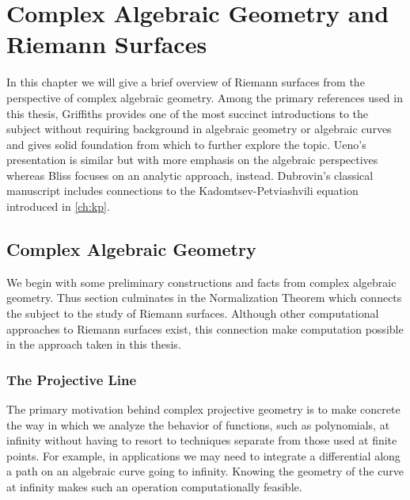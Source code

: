 \chapter{Complex Algebraic Geometry and Riemann Surfaces}\label{ch:background}

In this chapter we will give a brief overview of Riemann surfaces from the
perspective of complex algebraic geometry. Among the primary references used in
this thesis, Griffiths \cite{Giffiths89} provides one of the most succinct
introductions to the subject without requiring background in algebraic geometry
or algebraic curves and gives solid foundation from which to further explore the
topic. Ueno's \cite{Ueno97} presentation is similar but with more emphasis on
the algebraic perspectives whereas Bliss \cite{bliss} focuses on an analytic
approach, instead. Dubrovin's \cite{Dubrovin81} classical manuscript includes
connections to the Kadomtsev-Petviashvili equation introduced in
\autoref{ch:kp}.

\section{Complex Algebraic Geometry}\label{sec:background-complex-algebraic-geometry}

We begin with some preliminary constructions and facts from complex algebraic
geometry. Thus section culminates in the Normalization Theorem which connects
the subject to the study of Riemann surfaces. Although other computational
approaches to Riemann surfaces exist, this connection make computation possible
in the approach taken in this thesis.

\subsection{The Projective Line}

The primary motivation behind complex projective geometry is to make concrete
the way in which we analyze the behavior of functions, such as polynomials, at
infinity without having to resort to techniques separate from those used at
finite points. For example, in applications we may need to integrate a
differential along a path on an algebraic curve going to infinity. Knowing the
geometry of the curve at infinity makes such an operation computationally
feasible.

